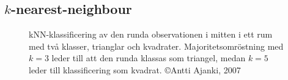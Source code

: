 \documentclass[../rapport_MVEX01-11-05]{subfiles}
\begin{document}
\subsection{$k$-nearest-neighbour}

%

\begin{figure}[!htpb]
    \begin{center}
    \end{center}
    \caption{kNN-klassificering av den runda observationen i mitten i ett rum
    med två klasser, trianglar och kvadrater. Majoritetsomröstning
    med $k=3$ leder till att den runda klassas som triangel, medan $k=5$ leder
    till klassificering som kvadrat. \copyright Antti Ajanki, 2007}
    \label{fig:knn-overview}
\end{figure}
\end{document}
